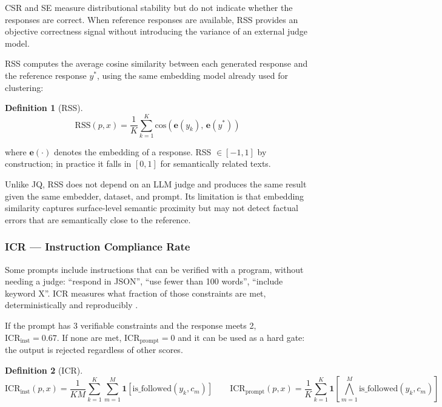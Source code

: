 \documentclass[11pt,a4paper]{article}
\newtheorem{definition}{Definition}
\begin{document}
CSR and SE measure distributional stability but do not indicate whether the responses are correct. When reference responses are available, RSS provides an objective correctness signal without introducing the variance of an external judge model.

RSS computes the average cosine similarity between each generated response and the reference response $y^*$, using the same embedding model already used for clustering:

\begin{definition}[RSS]
\[
\mathrm{RSS}(p, x) = \frac{1}{K} \sum_{k=1}^{K} \mathrm{cos}\!\left(\mathbf{e}(y_k),\, \mathbf{e}(y^*)\right)
\]
\end{definition}

\noindent where $\mathbf{e}(\cdot)$ denotes the embedding of a response. RSS $\in [-1, 1]$ by construction; in practice it falls in $[0, 1]$ for semantically related texts.

Unlike JQ, RSS does not depend on an LLM judge and produces the same result given the same embedder, dataset, and prompt. Its limitation is that embedding similarity captures surface-level semantic proximity but may not detect factual errors that are semantically close to the reference.

\subsubsection{ICR — Instruction Compliance Rate}

Some prompts include instructions that can be verified with a program, without needing a judge: ``respond in JSON'', ``use fewer than 100 words'', ``include keyword X''. ICR measures what fraction of those constraints are met, deterministically and reproducibly \citep{ifeval2023}.

If the prompt has 3 verifiable constraints and the response meets 2, $\mathrm{ICR}_\mathrm{inst} = 0.67$. If none are met, $\mathrm{ICR}_\mathrm{prompt} = 0$ and it can be used as a hard gate: the output is rejected regardless of other scores.

\begin{definition}[ICR]
\[
\mathrm{ICR}_\mathrm{inst}(p, x) = \frac{1}{KM} \sum_{k=1}^{K} \sum_{m=1}^{M} \mathbf{1}\left[\mathrm{is\_followed}(y_k, c_m)\right]
\qquad
\mathrm{ICR}_\mathrm{prompt}(p, x) = \frac{1}{K} \sum_{k=1}^{K} \mathbf{1}\left[\bigwedge_{m=1}^{M} \mathrm{is\_followed}(y_k, c_m)\right]
\]
\end{definition}
\end{document}
